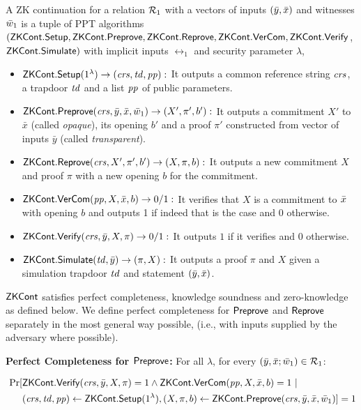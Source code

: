 \begin{definition}[ZK Continuation]
\label{def:zk_cont}
A ZK continuation for a relation $\mathcal{R}_1$ with a vectors of 
inputs $(\bar{y}, \bar{x})$ and witnesses $\bar{w}_1$ is a tuple of PPT algorithms 
$({\mathsf{ZKCont}}.{\mathsf{Setup}}, {\mathsf{ZKCont}}.{\mathsf{Preprove}}, {\mathsf{ZKCont}}.{\mathsf{Reprove}}, 
{\mathsf{ZKCont}}.{\mathsf{VerCom}}, {\mathsf{ZKCont}}.{\mathsf{Verify}} $, ${\mathsf{ZKCont}}.{\mathsf{Simulate}})$
with  implicit inputs $ \rel_1  $ and security parameter $\lambda$,
\begin{itemize}

\item ${\mathsf{ZKCont}}.{\mathsf{Setup}}(1^{\lambda}) \rightarrow (\mathit{crs}, \mathit{td}, \mathit{pp}):$ It outputs a common reference 
string $\mathit{crs}$, a trapdoor $\mathit{td}$ and a list $\mathit{pp}$ of public parameters.

\item ${\mathsf{ZKCont}}.{\mathsf{Preprove}}(\mathit{crs}, \bar{y}, \bar{x}, \bar{w}_1) \rightarrow (X', \pi', b'):$ It
outputs a commitment $X'$ to $\bar{x}$ (called \emph{opaque}), its opening $ b' $ and a proof $\pi'$ constructed from vector of inputs $\bar{y}$ (called \emph{transparent}).
\item ${\mathsf{ZKCont}}.{\mathsf{Reprove}}(\mathit{crs}, X', \pi', b') \rightarrow (X, \pi, b):$ It
outputs a new commitment $X$ and proof $\pi$ with a new opening $b$ for the commitment. 

\item ${\mathsf{ZKCont}}.{\mathsf{VerCom}}(\mathit{pp}, X, \bar{x}, b) \rightarrow 0/1:$
It verifies that  $X$ is a commitment to $\bar{x}$ with opening $b$ and 
outputs 1 if indeed that is the case and 0 otherwise.
 
\item ${\mathsf{ZKCont}}.{\mathsf{Verify}}(\mathit{crs}, \bar{y}, X, \pi) \rightarrow 0/1:$ It outputs $1$ if it verifies  and $0$ otherwise.

\item ${\mathsf{ZKCont}}.{\mathsf{Simulate}}(\mathit{td}, \bar{y})\rightarrow (\pi, X):$ It outputs a proof $\pi$ and $X$ given a simulation trapdoor $\mathit{td}$ and statement $(\bar{y}, \bar{x})$. 

\end{itemize}
$ {\mathsf{ZKCont}} $ satisfies perfect completeness, knowledge soundness and zero-knowledge as defined below.
We define perfect completeness for ${\mathsf{Preprove}}$ and ${\mathsf{Reprove}}$  separately  in the most general way possible,
(i.e., with inputs supplied by the adversary where possible).  

\noindent \textbf{Perfect Completeness for ${\mathsf{Preprove}}$:} For all $\lambda $, for every $(\bar{y}, \bar{x}; \bar{w}_1) \in \mathcal{R}_1$:
\begin{footnotesize}
\begin{align*}\
\Pr[&{\mathsf{ZKCont}}.{\mathsf{Verify}}(\mathit{crs}, \bar{y}, X, \pi) = 1 \wedge  {\ensuremath{\mathsf{ZKCont}}}.{\mathsf{VerCom}} (\mathit{pp}, X, \bar{x}, b) = 1\  | \ \\ 
&(\mathit{crs}, \mathit{td}, \mathit{pp}) \leftarrow {\ensuremath{\mathsf{ZKCont}}}.{\mathsf{Setup}} (1^{\lambda}), (X, \pi, b) \leftarrow {\ensuremath{\mathsf{ZKCont}}}.{\mathsf{Preprove}}(\mathit{crs}, \bar{y}, \bar{x}, \bar{w}_1)] = 1
\end{align*}
	

\end{footnotesize}
\end{definition}
